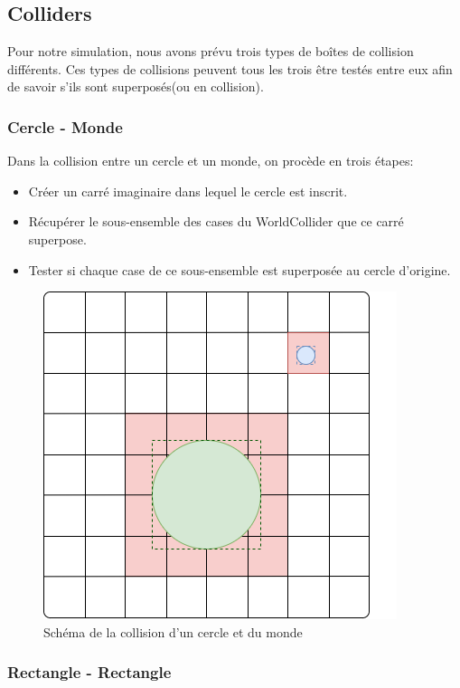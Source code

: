 \documentclass{EPUProjetDi}
\begin{document}
\subsection{Colliders}

Pour notre simulation, nous avons prévu trois types de boîtes de collision différents. Ces types de collisions
peuvent tous les trois être testés entre eux afin de savoir s'ils sont superposés(ou en collision).

\subsubsection*{Cercle - Monde}

Dans la collision entre un cercle et un monde, on procède en trois étapes:
\begin{itemize}
    \item Créer un carré imaginaire dans lequel le cercle est inscrit.
    \item Récupérer le sous-ensemble des cases du WorldCollider que ce carré superpose.
    \item Tester si chaque case de ce sous-ensemble est superposée au cercle d'origine.
\end{itemize}

\begin{figure}[h]
    \centering
    \includegraphics[scale=0.6]{world_collider_circle.png}
    \caption{Schéma de la collision d'un cercle et du monde}
    \label{fig:world_collider_circle}
\end{figure}

\pagebreak

\subsubsection*{Rectangle - Rectangle}
\end{document}
